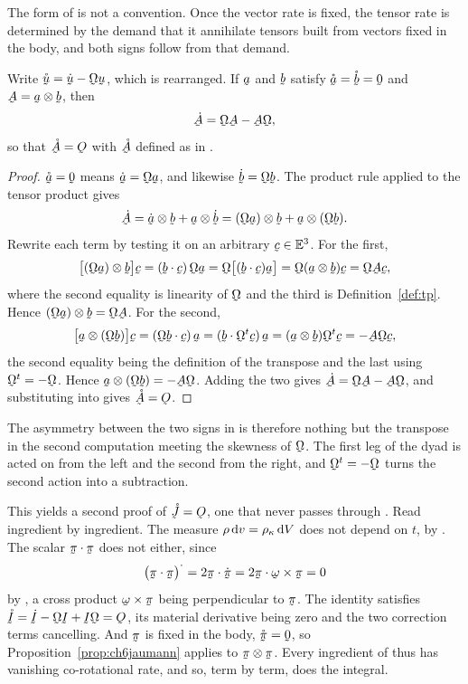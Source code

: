 The form of  is not a convention. Once the vector rate
 is fixed, the tensor rate is determined by the demand that it
annihilate tensors built from vectors fixed in the body, and both signs
follow from that demand.

\begin{proposition}%
\label{prop:ch6jaumann}
Write $\mathring\bu=\dot\bu-\bOm\bu$, which is  rearranged. If
$\ba$ and $\bb$ satisfy $\mathring\ba=\mathring\bb=\bze$ and
$\bA=\ba\otimes\bb$, then
\[
   \dot\bA=\bOm\bA-\bA\bOm ,
\]
so that $\mathring\bA=\Ob$ with $\mathring\bA$ defined as in
.
\end{proposition}

\begin{proof}
$\mathring\ba=\bze$ means $\dot\ba=\bOm\ba$, and likewise
$\dot\bb=\bOm\bb$. The product rule applied to the tensor product gives
\[
   \dot\bA=\dot\ba\otimes\bb+\ba\otimes\dot\bb
   =(\bOm\ba)\otimes\bb+\ba\otimes(\bOm\bb) .
\]
Rewrite each term by testing it on an arbitrary $\bc\in\Vt$. For the
first,
\[
   \big[(\bOm\ba)\otimes\bb\big]\bc=(\ip\bb\bc)\,\bOm\ba
   =\bOm\big[(\ip\bb\bc)\ba\big]=\bOm(\ba\otimes\bb)\bc=\bOm\bA\bc ,
\]
where the second equality is linearity of $\bOm$ and the third is
Definition~\ref{def:tp}. Hence $(\bOm\ba)\otimes\bb=\bOm\bA$. For the
second,
\[
   \big[\ba\otimes(\bOm\bb)\big]\bc=(\ip{\bOm\bb}\bc)\,\ba
   =(\ip\bb{\bOm^{t}\bc})\,\ba=(\ba\otimes\bb)\bOm^{t}\bc
   =-\bA\bOm\bc ,
\]
the second equality being the definition of the transpose and the last
using $\bOm^{t}=-\bOm$. Hence
$\ba\otimes(\bOm\bb)=-\bA\bOm$. Adding the two gives
$\dot\bA=\bOm\bA-\bA\bOm$, and substituting into  gives
$\mathring\bA=\Ob$.
\end{proof}

The asymmetry between the two signs in  is therefore nothing
but the transpose in the second computation meeting the skewness of
$\bOm$. The first leg of the dyad is acted on from the left and the
second from the right, and $\bOm^{t}=-\bOm$ turns the second action into
a subtraction.

This yields a second proof of $\mathring{\vek{J}}=\Ob$, one that never
passes through . Read  ingredient by ingredient. The
measure $\rho\,\mathrm{d} v=\rho_{\kappa}\,\mathrm{d} V$ does not depend on $t$, by
. The scalar $\ip{\vek\pi}{\vek\pi}$ does not either, since
\[
   \big(\ip{\vek\pi}{\vek\pi}\big)^{\textstyle\cdot}
   =2\ip{\vek\pi}{\dot{\vek\pi}}
   =2\ip{\vek\pi}{\bom\times\vek\pi}=0
\]
by , a cross product $\bom\times\vek\pi$ being perpendicular
to $\vek\pi$. The identity satisfies
$\mathring\I=\dot\I-\bOm\I+\I\bOm=\Ob$, its material derivative being
zero and the two correction terms cancelling. And $\vek\pi$ is fixed in
the body, $\mathring{\vek\pi}=\bze$, so
Proposition~\ref{prop:ch6jaumann} applies to
$\vek\pi\otimes\vek\pi$. Every ingredient of  thus has
vanishing co-rotational rate, and so, term by term, does the integral.

